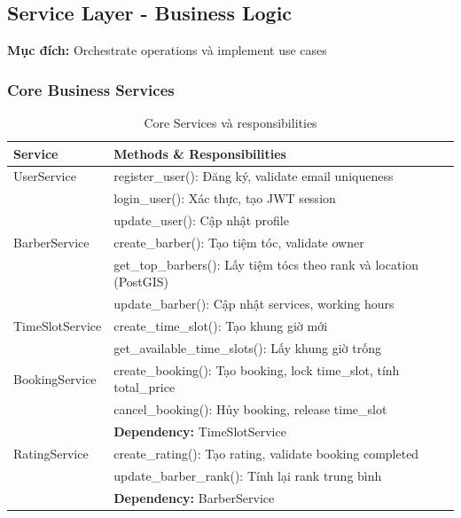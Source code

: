 \vspace{0.5cm}

\subsection{Service Layer - Business Logic}

\textbf{Mục đích:} Orchestrate operations và implement use cases

\subsubsection{Core Business Services}

\begin{table}[H]
\centering
\caption{Core Services và responsibilities}
\begin{tabular}{|l|p{10cm}|}
\hline
\textbf{Service} & \textbf{Methods \& Responsibilities} \\
\hline
UserService & 
register\_user(): Đăng ký, validate email uniqueness \\
& login\_user(): Xác thực, tạo JWT session \\
& update\_user(): Cập nhật profile \\
\hline
BarberService & 
create\_barber(): Tạo tiệm tóc, validate owner \\
& get\_top\_barbers(): Lấy tiệm tócs theo rank và location (PostGIS) \\
& update\_barber(): Cập nhật services, working hours \\
\hline
TimeSlotService & 
create\_time\_slot(): Tạo khung giờ mới \\
& get\_available\_time\_slots(): Lấy khung giờ trống \\
\hline
BookingService & 
create\_booking(): Tạo booking, lock time\_slot, tính total\_price \\
& cancel\_booking(): Hủy booking, release time\_slot \\
& \textbf{Dependency:} TimeSlotService \\
\hline
RatingService & 
create\_rating(): Tạo rating, validate booking completed \\
& update\_barber\_rank(): Tính lại rank trung bình \\
& \textbf{Dependency:} BarberService \\
\hline
\end{tabular}
\end{table}

\vspace{0.5cm}

